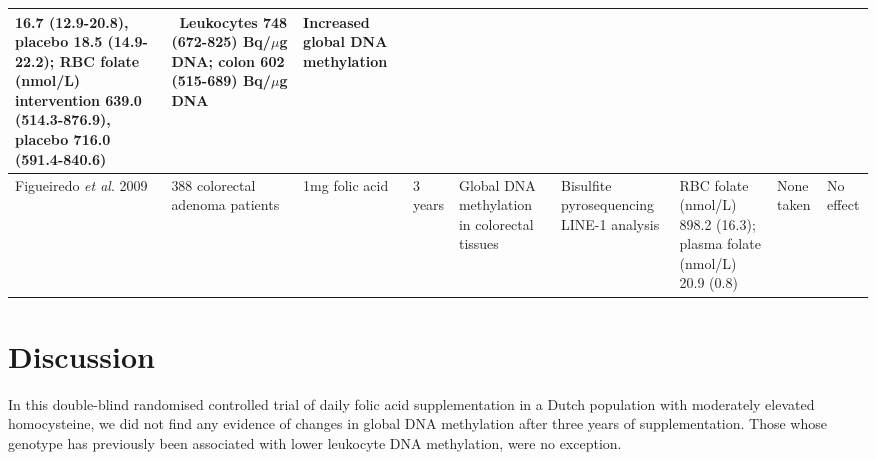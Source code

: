 \begin{landscape}
\begin{supertabular}{m{2.192cm}m{2.474cm}m{1.5569999cm}m{1.9099998cm}m{2.615cm}m{3.427cm}m{3.039cm}m{2.509cm}m{3.109cm}}
16.7 (12.9-20.8), placebo 18.5 (14.9-22.2); RBC folate (nmol/L)
intervention 639.0 (514.3-876.9), placebo 716.0 (591.4-840.6) &
 \ Leukocytes 748 (672-825)
Bq/$\mu$g DNA; colon 602 (515-689) Bq/$\mu$g DNA &
 Increased global DNA
methylation\\\hline
 Figueiredo \textit{et al}. 2009 \cite{c438} &
 388 colorectal adenoma patients &
 1mg folic acid &
 3 years &
 Global DNA methylation in colorectal
tissues &
 Bisulfite pyrosequencing LINE-1
analysis &
 RBC folate (nmol/L) 898.2 (16.3);
plasma folate (nmol/L) 20.9 (0.8) &
 None taken &
 No effect\\\hline
\end{supertabular}
\end{landscape}

 
\section{Discussion} %
\noindent In this double-blind randomised controlled trial of daily folic acid supplementation in a Dutch population with moderately elevated homocysteine, we did not find any evidence of changes in global DNA methylation after three years of supplementation. Those whose genotype has previously been associated with lower leukocyte DNA methylation, were no exception. 
 

